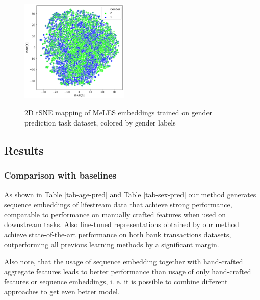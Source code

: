 \documentclass[sigconf, anonymous]{acmart}
\begin{document}
\begin{figure}[ht]
  \caption{2D tSNE mapping of MeLES embeddings trained on gender prediction task dataset, colored by gender labels}
  \includegraphics[width=0.46\textwidth]{figures/gender-tsne.png}
  \label{fig-tsne-gender}
\end{figure}

\subsection{Results} \label{sec-res}

\subsubsection{Comparison with baselines} \label{sec-res-baselines}

As shown in Table \ref{tab-age-pred} and Table \ref{tab-sex-pred} our method generates sequence embeddings of lifestream data that achieve strong performance, comparable to performance on manually crafted features when used on downstream tasks. Also fine-tuned representations obtained by our method achieve state-of-the-art performance on both bank transactions datasets, outperforming all previous learning methods by a significant margin.

Also note, that the usage of sequence embedding together with hand-crafted aggregate features leads to better performance than usage of only hand-crafted features or sequence embeddings, i. e. it is possible to combine different approaches to get even better model.
\end{document}
